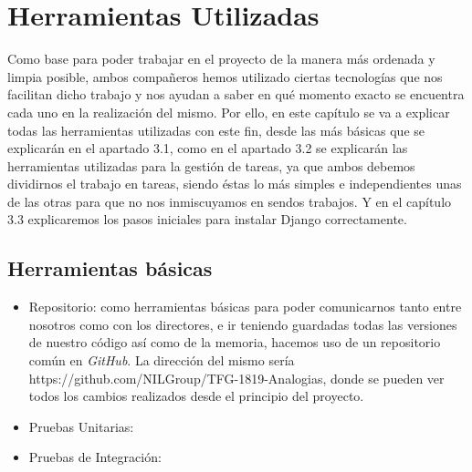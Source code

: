 \chapter{Herramientas Utilizadas}
\label{cap:herramientas}

Como base para poder trabajar en el proyecto de la manera más ordenada y limpia posible, ambos compañeros hemos utilizado ciertas tecnologías que nos facilitan dicho trabajo y nos ayudan a saber en qué momento exacto se encuentra cada uno en la realización del mismo.
Por ello, en este capítulo se va a explicar todas las herramientas utilizadas con este fin, desde las más básicas que se explicarán en el apartado 3.1, como en el apartado 3.2 se explicarán las herramientas utilizadas para la gestión de tareas, ya que ambos debemos dividirnos el trabajo en tareas, siendo éstas lo más simples e independientes unas de las otras para que no nos inmiscuyamos en sendos trabajos. Y en el capítulo 3.3 explicaremos los pasos iniciales para instalar Django correctamente.


\section{Herramientas básicas}
\label{cap:sec:herramientasBasicas}
	
	\begin{itemize}
	\item Repositorio: como herramientas básicas para poder comunicarnos tanto entre nosotros como con los directores, e ir teniendo  guardadas todas las versiones de nuestro código así como de la memoria, hacemos uso de un repositorio común en \textit{GitHub}. 
	La dirección del mismo sería https://github.com/NILGroup/TFG-1819-Analogias, donde se pueden ver todos los cambios realizados desde el principio del proyecto.

	\item Pruebas Unitarias: 
	\item Pruebas de Integración: 
	\end{itemize}

